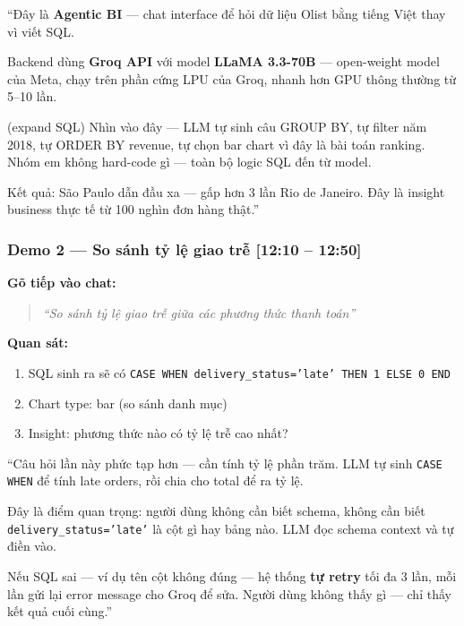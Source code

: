 \documentclass[12pt, a4paper]{article}
\newenvironment{speakerbox}[2]{%
  \begin{tcolorbox}[
    enhanced, breakable,
    colback=#1!6!white, colframe=#1,
    colbacktitle=#1, coltitle=white,
    fonttitle=\bfseries\large,
    title={#2}, arc=4pt, boxrule=1.5pt,
    left=8pt, right=8pt, top=6pt, bottom=6pt,
  ]
}{\end{tcolorbox}}
\newcommand{\timing}[1]{%
  \hfill{\small\bfseries\color{gray}[#1]}%
}
\begin{document}
\begin{speakerbox}{p4color}{\faUser\ Người 4 · Phần Agentic BI (khoảng 2 phút)}
\begin{scriptbox}
``Đây là \textbf{Agentic BI} --- chat interface để hỏi dữ liệu Olist bằng tiếng Việt
thay vì viết SQL.

Backend dùng \textbf{Groq API} với model \textbf{LLaMA 3.3-70B} --- open-weight model
của Meta, chạy trên phần cứng LPU của Groq, nhanh hơn GPU thông thường từ 5--10 lần.

(expand SQL) Nhìn vào đây --- LLM tự sinh câu GROUP BY, tự filter năm 2018, tự ORDER BY
revenue, tự chọn bar chart vì đây là bài toán ranking. Nhóm em không hard-code gì ---
toàn bộ logic SQL đến từ model.

Kết quả: São Paulo dẫn đầu xa --- gấp hơn 3 lần Rio de Janeiro. Đây là insight
business thực tế từ 100 nghìn đơn hàng thật.''
\end{scriptbox}

\subsubsection*{Demo 2 — So sánh tỷ lệ giao trễ \timing{12:10 -- 12:50}}

\begin{demobox}
\textbf{Gõ tiếp vào chat:}
\begin{quote}
\textit{``So sánh tỷ lệ giao trễ giữa các phương thức thanh toán''}
\end{quote}
\textbf{Quan sát:}
\begin{enumerate}[leftmargin=1.5em, itemsep=2pt]
  \item SQL sinh ra sẽ có \texttt{CASE WHEN delivery\_status='late' THEN 1 ELSE 0 END}
  \item Chart type: bar (so sánh danh mục)
  \item Insight: phương thức nào có tỷ lệ trễ cao nhất?
\end{enumerate}
\end{demobox}

\begin{scriptbox}
``Câu hỏi lần này phức tạp hơn --- cần tính tỷ lệ phần trăm. LLM tự sinh
\texttt{CASE WHEN} để tính late orders, rồi chia cho total để ra tỷ lệ.

Đây là điểm quan trọng: người dùng không cần biết schema, không cần biết
\texttt{delivery\_status='late'} là cột gì hay bảng nào. LLM đọc schema context
và tự điền vào.

Nếu SQL sai --- ví dụ tên cột không đúng --- hệ thống \textbf{tự retry} tối đa
3 lần, mỗi lần gửi lại error message cho Groq để sửa. Người dùng không thấy
gì --- chỉ thấy kết quả cuối cùng.''
\end{scriptbox}


\end{speakerbox}
\end{document}
